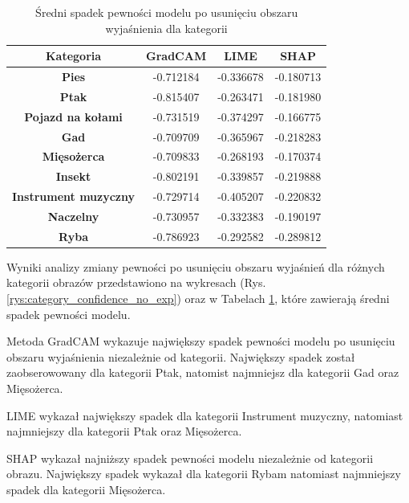\begin{table}[h]
	\centering
	\begin{tabular}{|c|c|c|c|}
		\hline
		\textbf{Kategoria}           & \textbf{GradCAM} & \textbf{LIME} & \textbf{SHAP} \\
		\hline
		\textbf{Pies}                & -0.712184        & -0.336678     & -0.180713     \\
		\hline
		\textbf{Ptak}                & -0.815407        & -0.263471     & -0.181980     \\
		\hline
		\textbf{Pojazd na kołami}    & -0.731519        & -0.374297     & -0.166775     \\
		\hline
		\textbf{Gad}                 & -0.709709        & -0.365967     & -0.218283     \\
		\hline
		\textbf{Mięsożerca}          & -0.709833        & -0.268193     & -0.170374     \\
		\hline
		\textbf{Insekt}              & -0.802191        & -0.339857     & -0.219888     \\
		\hline
		\textbf{Instrument muzyczny} & -0.729714        & -0.405207     & -0.220832     \\
		\hline
		\textbf{Naczelny}            & -0.730957        & -0.332383     & -0.190197     \\
		\hline
		\textbf{Ryba}                & -0.786923        & -0.292582     & -0.289812     \\
		\hline
	\end{tabular}
	\caption{Średni spadek pewności modelu po usunięciu obszaru wyjaśnienia dla kategorii}
	\label{tab:category_confidence_no_exp}
\end{table}

Wyniki analizy zmiany pewności po usunięciu obszaru wyjaśnień dla różnych kategorii obrazów przedstawiono na wykresach (Rys. \ref{rys:category_confidence_no_exp}) oraz w Tabelach \ref{tab:category_confidence_no_exp}, które zawierają średni spadek pewności modelu.

Metoda GradCAM wykazuje największy spadek pewności modelu po usunięciu obszaru wyjaśnienia niezależnie od kategorii.
Największy spadek został zaobserowowany dla kategorii Ptak, natomist najmniejsz dla kategorii Gad oraz Mięsożerca.

LIME wykazał największy spadek dla kategorii Instrument muzyczny, natomiast najmniejszy dla kategorii Ptak oraz Mięsożerca.

SHAP wykazał najniższy spadek pewności modelu niezależnie od kategorii obrazu.
Największy spadek wykazał dla kategorii Rybam natomiast najmniejszy spadek dla kategorii Mięsożerca.

